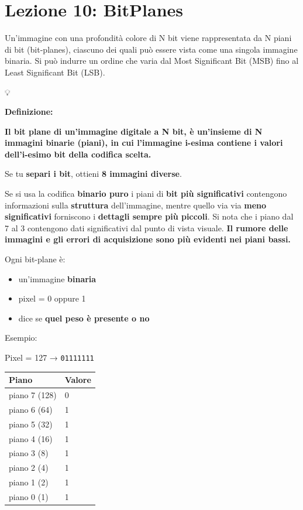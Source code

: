 \documentclass[
]{article}
\author{}
\date{}
\providecommand{\tightlist}{%
  \setlength{\itemsep}{0pt}\setlength{\parskip}{0pt}}
\begin{document}
\hypertarget{lezione-10-bitplanes}{%
\section{Lezione 10: BitPlanes}\label{lezione-10-bitplanes}}

Un'immagine con una profondità colore di N bit viene rappresentata da N piani di bit (bit-planes), ciascuno dei quali può essere vista come una singola immagine binaria. Si può indurre un ordine che varia dal Most Significant Bit (MSB) fino al Least Significant Bit (LSB).

💡

\textbf{Definizione:}

\textbf{Il bit plane di un'immagine digitale a N bit, è un'insieme di N immagini binarie (piani), in cui l'immagine i-esima contiene i valori dell'i-esimo bit della codifica scelta.}

Se tu \textbf{separi i bit}, ottieni \textbf{8 immagini diverse}.

Se si usa la codifica \textbf{binario puro} i piani di \textbf{bit più significativi} contengono informazioni sulla \textbf{struttura} dell'immagine, mentre quello via via \textbf{meno significativi} forniscono i \textbf{dettagli sempre più piccoli}.
Si nota che i piano dal 7 al 3 contengono dati significativi dal punto di vista visuale.
\textbf{Il rumore delle immagini e gli errori di acquisizione sono più evidenti nei piani bassi.}

Ogni bit-plane è:

\begin{itemize}
\tightlist
\item
  un'immagine \textbf{binaria}
\item
  pixel = 0 oppure 1
\item
  dice se \textbf{quel peso è presente o no}
\end{itemize}

Esempio:

Pixel = 127 → \texttt{01111111}

\begin{longtable}[]{@{}ll@{}}
\toprule\noalign{}
Piano & Valore \\
\midrule\noalign{}
\endhead
\bottomrule\noalign{}
\endlastfoot
piano 7 (128) & 0 \\
piano 6 (64) & 1 \\
piano 5 (32) & 1 \\
piano 4 (16) & 1 \\
piano 3 (8) & 1 \\
piano 2 (4) & 1 \\
piano 1 (2) & 1 \\
piano 0 (1) & 1 \\
\end{longtable}
\end{document}
